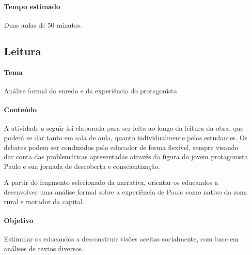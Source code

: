 \documentclass[12pt]{extarticle}
\begin{document}
\paragraph{Tempo estimado} Duas aulas de 50 minutos.

\subsection{Leitura}

\paragraph{Tema} Análise formal do enredo e da experiência do protagonista
  
\paragraph{Conteúdo}
A atividade a seguir foi elaborada para ser feita ao longo da leitura
da obra, que poderá se dar tanto em sala de aula, quanto
individualmente pelos estudantes. Os debates podem ser conduzidos pelo
educador de forma flexível, sempre visando dar conta das problemáticas
apresentadas através da figura do jovem protagonista Paulo e sua
jornada de descoberta e conscientização.

A partir do fragmento selecionado da narrativa, orientar os educandos
a desenvolver uma análise formal sobre a experiência de Paulo como
nativo da zona rural e morador da capital.

\paragraph{Objetivo}
Estimular os educandos a desconstruir visões aceitas socialmente, com
base em análises de textos diversos.
\end{document}
